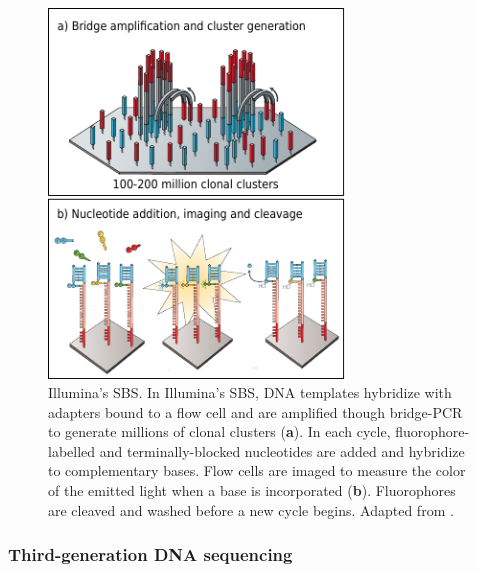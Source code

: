 \begin{figure}[h!]
    \centering
    \includegraphics[angle=0,width=0.7\textwidth]{figures/introduction/Figure5.pdf}
    \caption[Illumina's \ac{SBS}]{Illumina's \ac{SBS}. In Illumina's SBS, DNA templates hybridize with adapters bound to a flow cell and are amplified though bridge-PCR to generate millions of clonal clusters (\textbf{a}). In each cycle, fluorophore-labelled and terminally-blocked nucleotides are added and hybridize to complementary bases. Flow cells are imaged to measure the color of the emitted light when a base is incorporated (\textbf{b}). Fluorophores are cleaved and washed before a new cycle begins. Adapted from \cite{loman_twenty_2015, goodwin_coming_2016}.}
    \label{fig:introduction_figure5}
\end{figure}

\subsubsection{Third-generation DNA sequencing}

